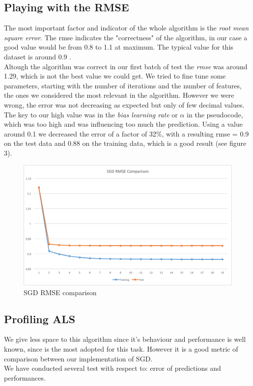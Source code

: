 \documentclass{sig-alternate-05-2015}
\begin{document}
\subsection{Playing with the RMSE}
The most important factor and indicator of the whole algorithm is the \textit{root mean
square error}. The rmse indicates the "correctness" of the algorithm, in our case
a good value would be from 0.8 to 1.1 at maximum. The typical value for this dataset
is around 0.9 \cite{mymedialite}.\\
Altough the algorithm was correct in our first batch of test the \textit{rmse} was
around 1.29, which is not the best value we could get. We tried to fine tune some
parameters, starting with the number of iterations and the number of features, the ones
we considered the most relevant in the algorithm. However we were wrong, the
error was not decreasing as expected but only of few decimal values.
The key to our high value was in the \textit{bias learning rate} or $\alpha$ in the pseudocode,
which was too high and was influencing too much the prediction. Using a value around 0.1 we decreased
the error of a factor of 32$\%$, with a resulting rmse = 0.9 on the test data and 0.88 on the training data,
which is a good result (see figure 3).
\begin{figure}
    \caption{SGD RMSE comparison}
    \centering
    \includegraphics[scale=0.4]{sgdrmseserial.png}
\end{figure}

\subsection{Profiling ALS}

We give less space to this algorithm since it's behaviour and performance
is well known, since is the most adopted for this task. However it is
a good metric of comparison between our implementation of SGD.\\
We have conducted several test with respect to: error of predictions and performances.
\end{document}
